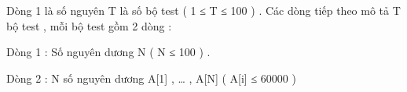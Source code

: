 Dòng 1 là số nguyên T là số bộ test ( 1 ≤ T ≤ 100 ) . Các dòng tiếp theo mô tả T bộ test , mỗi bộ test gồm 2 dòng :


Dòng 1 : Số nguyên dương N ( N ≤ 100 ) .


Dòng 2 : N số nguyên dương A[1] , … , A[N] ( A[i] ≤ 60000 )